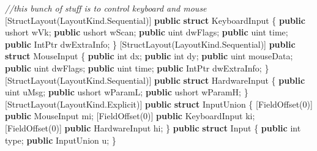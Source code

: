 \documentclass[
  openany]{book}
\newenvironment{Shaded}{\begin{snugshade}}{\end{snugshade}}
\newcommand{\CommentTok}[1]{\textcolor[rgb]{0.56,0.35,0.01}{\textit{#1}}}
\newcommand{\DataTypeTok}[1]{\textcolor[rgb]{0.13,0.29,0.53}{#1}}
\newcommand{\DecValTok}[1]{\textcolor[rgb]{0.00,0.00,0.81}{#1}}
\newcommand{\FunctionTok}[1]{\textcolor[rgb]{0.00,0.00,0.00}{#1}}
\newcommand{\KeywordTok}[1]{\textcolor[rgb]{0.13,0.29,0.53}{\textbf{#1}}}
\newcommand{\NormalTok}[1]{#1}
\begin{document}
\begin{Shaded}
\begin{Highlighting}[]
        \CommentTok{//this bunch of stuff is to control keyboard and mouse}
\NormalTok{        [}\FunctionTok{StructLayout}\NormalTok{(LayoutKind.}\FunctionTok{Sequential}\NormalTok{)]}
        \KeywordTok{public} \KeywordTok{struct}\NormalTok{ KeyboardInput}
\NormalTok{        \{}
            \KeywordTok{public} \DataTypeTok{ushort}\NormalTok{ wVk;}
            \KeywordTok{public} \DataTypeTok{ushort}\NormalTok{ wScan;}
            \KeywordTok{public} \DataTypeTok{uint}\NormalTok{ dwFlags;}
            \KeywordTok{public} \DataTypeTok{uint}\NormalTok{ time;}
            \KeywordTok{public}\NormalTok{ IntPtr dwExtraInfo;}
\NormalTok{        \}}
\NormalTok{        [}\FunctionTok{StructLayout}\NormalTok{(LayoutKind.}\FunctionTok{Sequential}\NormalTok{)]}
        \KeywordTok{public} \KeywordTok{struct}\NormalTok{ MouseInput}
\NormalTok{        \{}
            \KeywordTok{public} \DataTypeTok{int}\NormalTok{ dx;}
            \KeywordTok{public} \DataTypeTok{int}\NormalTok{ dy;}
            \KeywordTok{public} \DataTypeTok{uint}\NormalTok{ mouseData;}
            \KeywordTok{public} \DataTypeTok{uint}\NormalTok{ dwFlags;}
            \KeywordTok{public} \DataTypeTok{uint}\NormalTok{ time;}
            \KeywordTok{public}\NormalTok{ IntPtr dwExtraInfo;}
\NormalTok{        \}}
\NormalTok{        [}\FunctionTok{StructLayout}\NormalTok{(LayoutKind.}\FunctionTok{Sequential}\NormalTok{)]}
        \KeywordTok{public} \KeywordTok{struct}\NormalTok{ HardwareInput}
\NormalTok{        \{}
            \KeywordTok{public} \DataTypeTok{uint}\NormalTok{ uMsg;}
            \KeywordTok{public} \DataTypeTok{ushort}\NormalTok{ wParamL;}
            \KeywordTok{public} \DataTypeTok{ushort}\NormalTok{ wParamH;}
\NormalTok{        \}}
\NormalTok{        [}\FunctionTok{StructLayout}\NormalTok{(LayoutKind.}\FunctionTok{Explicit}\NormalTok{)]}
        \KeywordTok{public} \KeywordTok{struct}\NormalTok{ InputUnion}
\NormalTok{        \{}
\NormalTok{            [}\FunctionTok{FieldOffset}\NormalTok{(}\DecValTok{0}\NormalTok{)] }\KeywordTok{public}\NormalTok{ MouseInput mi;}
\NormalTok{            [}\FunctionTok{FieldOffset}\NormalTok{(}\DecValTok{0}\NormalTok{)] }\KeywordTok{public}\NormalTok{ KeyboardInput ki;}
\NormalTok{            [}\FunctionTok{FieldOffset}\NormalTok{(}\DecValTok{0}\NormalTok{)] }\KeywordTok{public}\NormalTok{ HardwareInput hi;}
\NormalTok{        \}}
        \KeywordTok{public} \KeywordTok{struct}\NormalTok{ Input}
\NormalTok{        \{}
            \KeywordTok{public} \DataTypeTok{int}\NormalTok{ type;}
            \KeywordTok{public}\NormalTok{ InputUnion u;}
\NormalTok{        \}}

\end{Highlighting}
\end{Shaded}
\end{document}

